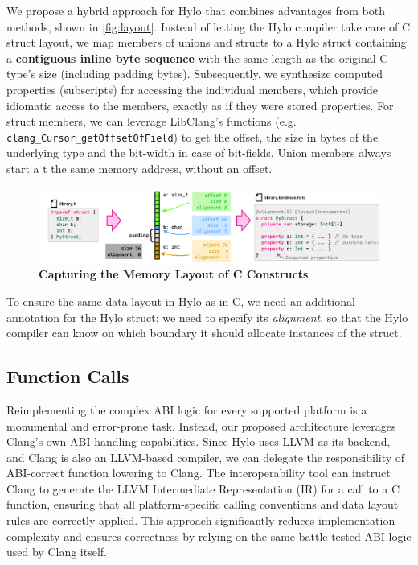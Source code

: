 We propose a hybrid approach for Hylo that combines advantages from both methods, shown in \autoref{fig:layout}. Instead of letting the Hylo compiler take care of C struct layout, we map members of unions and structs to a Hylo struct containing a \textbf{contiguous inline byte sequence} with the same length as the original C type's size (including padding bytes). Subsequently, we synthesize computed properties (subscripts) for accessing the individual members, which provide idiomatic access to the members, exactly as if they were stored properties. For struct members, we can leverage LibClang's functions (e.g. \texttt{clang\_Cursor\_getOffsetOfField}) to get the offset, the size in bytes of the underlying type and the bit-width in case of bit-fields. Union members always start a  t the same memory address, without an offset\cite{c23-struct-and-union-specifiers}.
\begin{figure}
    \includegraphics[width=1\textwidth]{attachments/layout.pdf}
    \caption{\textbf{Capturing the Memory Layout of C Constructs}}
    \label{fig:layout}
\end{figure}
To ensure the same data layout in Hylo as in C, we need an additional annotation for the Hylo struct: we need to specify its \textit{alignment}, so that the Hylo compiler can know on which boundary it should allocate instances of the struct.

\subsection{Function Calls}


Reimplementing the complex ABI logic for every supported platform is a monumental and error-prone task. Instead, our proposed architecture leverages Clang's own ABI handling capabilities. Since Hylo uses LLVM as its backend, and Clang is also an LLVM-based compiler, we can delegate the responsibility of ABI-correct function lowering to Clang. The interoperability tool can instruct Clang to generate the LLVM Intermediate Representation (IR) for a call to a C function, ensuring that all platform-specific calling conventions and data layout rules are correctly applied. This approach significantly reduces implementation complexity and ensures correctness by relying on the same battle-tested ABI logic used by Clang itself.

